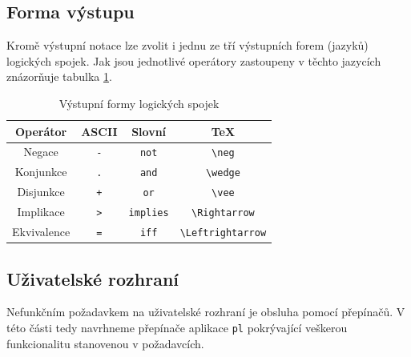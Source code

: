 \documentclass[thesis=B,czech,hidelinks]{thesis}[2012/06/26]
\begin{document}
\subsection{Forma výstupu}

Kromě výstupní notace lze zvolit i jednu ze tří výstupních forem (jazyků) logických spojek. Jak jsou jednotlivé operátory zastoupeny v těchto jazycích znázorňuje tabulka \ref{tab:connectives_language}.

\begin{table}
\centering
\caption{Výstupní formy logických spojek}
\label{tab:connectives_language}
\begin{tabular}{|c||c|c|c|}\hline
Operátor & ASCII & Slovní & \TeX \tabularnewline \hline \hline
Negace & \verb|-| & \verb|not| & \verb|\neg| \tabularnewline \hline
Konjunkce & \verb|.| & \verb|and| & \verb|\wedge| \tabularnewline \hline
Disjunkce & \verb|+| & \verb|or| & \verb|\vee| \tabularnewline \hline
Implikace & \verb|>| & \verb|implies| & \verb|\Rightarrow| \tabularnewline \hline
Ekvivalence & \verb|=| & \verb|iff| & \verb|\Leftrightarrow| \tabularnewline \hline
\end{tabular}
\end{table}

\subsection{Uživatelské rozhraní}

Nefunkčním požadavkem na uživatelské rozhraní je obsluha pomocí přepínačů. V této části tedy navrhneme přepínače aplikace \texttt{pl} pokrývající veškerou funkcionalitu stanovenou v požadavcích. 
\end{document}
